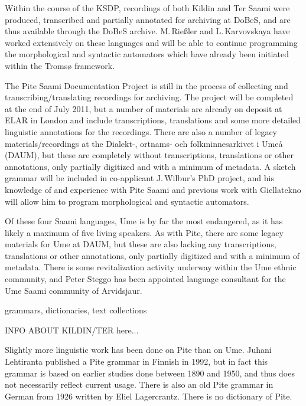 \documentclass[a4paper,12pt]{article}
\begin{document}
Within the course of the KSDP, recordings of both Kildin and Ter Saami were produced, transcribed and partially annotated for archiving at DoBeS, and are thus available through the DoBeS archive. %
M.\,Rießler and L.\,Karvovskaya have worked extensively on these languages and will be able to continue programming the morphological and syntactic automators which have already been initiated within the Tromsø framework.

The Pite Saami Documentation Project is still in the process of collecting and transcribing/translating recordings for archiving. The project will be completed at the end of July 2011, but a number of materials are already on deposit at ELAR in London and include transcriptions, translations and some more detailed linguistic annotations for the recordings. There are also a number of legacy materials/recordings at the Dialekt-, ortnams- och folkminnesarkivet i Umeå (DAUM), but these are completely without transcriptions, translations or other annotations, only partially digitized and with a minimum of metadata. A sketch grammar will be included in co-applicant J.\,Wilbur's PhD project, and his knowledge of and experience with Pite Saami and previous work with Giellatekno will allow him to program morphological and syntactic automators.

Of these four Saami languages, Ume is by far the most endangered, as it has likely a maximum of five living speakers. As with Pite, there are some legacy materials for Ume at DAUM, but these are also lacking any transcriptions, translations or other annotations, only partially digitized and with a minimum of metadata. There is some revitalization activity underway within the Ume ethnic community, and Peter Steggo has been appointed language consultant for the Ume Saami community of Arvidsjaur. %


grammars, dictionaries, text collections

INFO ABOUT KILDIN/TER here...

Slightly more linguistic work has been done on Pite than on Ume. Juhani Lehtiranta published a Pite grammar in Finnish in 1992, but in fact this grammar is based on earlier studies done between 1890 and 1950, and thus does not necessarily reflect current usage. There is also an old Pite grammar in German from 1926 written by Eliel Lagercrantz. There is no dictionary of Pite.
\end{document}
